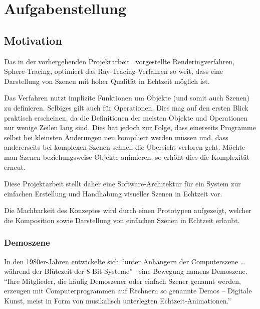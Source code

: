 
\chapter{Aufgabenstellung}
\label{chap:scope}

\section{Motivation}
\label{sec:motivation}

Das in der vorhergehenden Projektarbeit~\cite{osterwalder_sven_volume_2016}
vorgestellte Renderingverfahren, Sphere-Tracing, optimiert das
Ray-Tracing-Verfahren so weit, dass eine Darstellung von Szenen mit hoher
Qualität in Echtzeit möglich ist.

Das Verfahren nutzt implizite Funktionen um Objekte (und somit auch
Szenen) zu definieren. Selbiges gilt auch für Operationen. Dies mag auf
den ersten Blick praktisch erscheinen, da die Definitionen der meisten Objekte
und Operationen nur wenige Zeilen lang sind. Dies hat jedoch zur Folge, dass
einerseits Programme selbst bei kleinsten Änderungen neu kompiliert werden
müssen und, dass andererseits bei komplexen Szenen schnell die Übersicht
verloren geht. Möchte man Szenen beziehungsweise Objekte animieren, so erhöht dies die
Komplexität erneut.

Diese Projektarbeit stellt daher eine Software-Architektur für ein System zur
einfachen Erstellung und Handhabung visueller Szenen in Echtzeit vor.

Die Machbarkeit des Konzeptes wird durch einen Prototypen aufgezeigt, welcher
die Komposition sowie Darstellung von einfachen Szenen in Echtzeit erlaubt.

\subsection{Demoszene}
\label{subsec:demoscene}

In den 1980er-Jahren entwickelte sich ``unter Anhängern der
Computerszene \dots{} während der Blütezeit der
8-Bit-Systeme''~\parencite{wikipedia_foundation_demoszene_2015} eine Bewegung
namens Demoszene. ``Ihre Mitglieder, die häufig Demoszener oder einfach
Szener genannt werden, erzeugen mit Computerprogrammen auf Rechnern so
genannte Demos – Digitale Kunst, meist in Form von musikalisch
unterlegten
Echtzeit-Animationen.''~\parencite{wikipedia_foundation_demoszene_2015}

